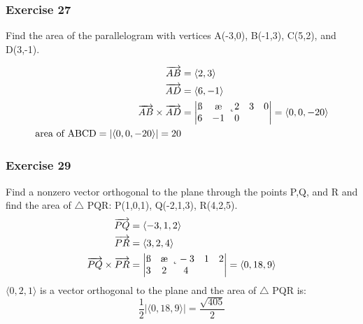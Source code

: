 \documentclass{math}
\begin{document}
\subsubsection*{Exercise 27}
Find the area of the parallelogram with vertices A(-3,0), B(-1,3), C(5,2), and
D(3,-1).
\begin{center}
\end{center}
\begin{align*}
  \overrightarrow{AB} &= \langle2,3\rangle \\
  \overrightarrow{AD} &= \langle6,-1\rangle \\
  \overrightarrow{AB}\times\overrightarrow{AD} &= \begin{vmatrix}
    \i & \j & \k \\
    2 & 3 & 0 \\
    6 & -1 & 0 \\
  \end{vmatrix} = \langle0,0,-20\rangle \\
  \text{area of ABCD} = |\langle0,0,-20\rangle| = 20
\end{align*}

\subsubsection*{Exercise 29}
Find a nonzero vector orthogonal to the plane through the points P,Q, and R and
find the area of \( \triangle \) PQR: P(1,0,1), Q(-2,1,3), R(4,2,5).
\begin{align*}
  \overrightarrow{PQ} &= \langle-3,1,2\rangle \\
  \overrightarrow{PR} &= \langle3,2,4\rangle \\
  \overrightarrow{PQ}\times\overrightarrow{PR} &= \begin{vmatrix}
    \i & \j & \k \\
    -3 & 1 & 2 \\
    3 & 2 & 4
  \end{vmatrix} = \langle0,18,9\rangle
\end{align*}
\( \langle0,2,1\rangle \) is a vector orthogonal to the plane and the area of
\( \triangle \) PQR is:
\[ \frac{1}{2}|\langle0,18,9\rangle| = \frac{\sqrt{405}}{2} \]
\end{document}
